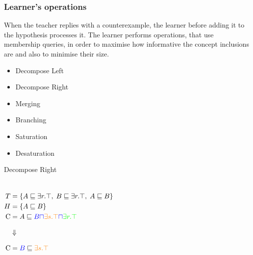 \documentclass[handout]{beamer}\mode<handout>{\usetheme{AMSBolognaFC}}
\begin{document}
\begin{frame}[c, allowframebreaks]
\frametitle{Learner's operations}

    When the teacher replies with a counterexample, the learner before adding it to the hypothesis \alert{processes} it.
    The learner performs operations, that use membership queries, in order to \alert{maximise} how informative the concept inclusions are and also to \alert{minimise} their size.

    \begin{itemize}
        \item Decompose Left
        \item Decompose Right
        \item Merging
        \item Branching
        \item Saturation
        \item Desaturation
    \end{itemize}

    \framebreak

    Decompose Right

    \begin{columns}[c]
    \vspace{-1cm}
    \begin{equation*}
    \begin{aligned}
        T &= \{A \sqsubseteq \exists r.\top,\; B \sqsubseteq \exists r.\top,\; A \sqsubseteq B\} \\
        H &= \{A \sqsubseteq B\} \\
        \text{C} &= A \sqsubseteq
            \textcolor{blue}{B \sqcap}
            \textcolor{orange}{\exists s.\top}
            \textcolor{blue}{\sqcap}
            \textcolor{green}{\exists r.\top}
        \\[0.8em]
        &\Downarrow \\[0.8em]
        \text{C} &= \textcolor{blue}{B} \sqsubseteq
            \textcolor{orange}{\exists s.\top}
    \end{aligned}
    \end{equation*}

    \centering

    \vspace{1cm}


\end{columns}
\end{frame}
\end{document}
